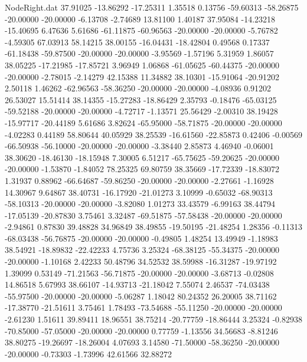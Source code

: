 \begin{filecontents}{NodeRight.dat}
  37.91025  -13.86292  -17.25311     1.35518    0.13756  -59.60313  -58.26875  -20.00000  -20.00000   -6.13708   -2.74689   13.81100    1.40187
  37.95084  -14.23218  -15.40695     6.47636    5.61686  -61.11875  -60.96563  -20.00000  -20.00000   -5.76782   -4.59305   67.03913   58.14215
  38.00155  -16.04431  -18.42804     0.49568    0.17337  -61.18438  -59.87500  -20.00000  -20.00000   -3.95569   -1.57196    5.31959    1.86057
  38.05225  -17.21985  -17.85721     3.96949    1.06868  -61.05625  -60.44375  -20.00000  -20.00000   -2.78015   -2.14279   42.15388   11.34882
  38.10301  -15.91064  -20.91202     2.50118    1.46262  -62.96563  -58.36250  -20.00000  -20.00000   -4.08936    0.91202   26.53027   15.51414
  38.14355  -15.27283  -18.86429     2.35793   -0.18476  -65.03125  -59.52188  -20.00000  -20.00000   -4.72717   -1.13571   25.56429   -2.00310
  38.19428  -15.97717  -20.44189     5.61686    3.82624  -65.95000  -58.71875  -20.00000  -20.00000   -4.02283    0.44189   58.80644   40.05929
  38.25539  -16.61560  -22.85873     0.42406   -0.00569  -66.50938  -56.10000  -20.00000  -20.00000   -3.38440    2.85873    4.46940   -0.06001
  38.30620  -18.46130  -18.15948     7.30005    6.51217  -65.75625  -59.20625  -20.00000  -20.00000   -1.53870   -1.84052   78.25325   69.80759
  38.35669  -17.72339  -18.83072     1.31937    0.88962  -66.64687  -59.86250  -20.00000  -20.00000   -2.27661   -1.16928   14.30967    9.64867
  38.40731  -16.17920  -21.01273     3.10999   -0.65032  -68.90313  -58.10313  -20.00000  -20.00000   -3.82080    1.01273   33.43579   -6.99163
  38.44794  -17.05139  -20.87830     3.75461    3.32487  -69.51875  -57.58438  -20.00000  -20.00000   -2.94861    0.87830   39.48828   34.96849
  38.49855  -19.50195  -21.48254     1.28356   -0.11313  -68.03438  -56.76875  -20.00000  -20.00000   -0.49805    1.48254   13.49949   -1.18983
  38.54921  -18.89832  -22.42233     4.75736    3.25324  -68.38125  -55.34375  -20.00000  -20.00000   -1.10168    2.42233   50.48796   34.52532
  38.59988  -16.31287  -19.97192     1.39099    0.53149  -71.21563  -56.71875  -20.00000  -20.00000   -3.68713   -0.02808   14.86518    5.67993
  38.66107  -14.93713  -21.18042     7.55074    2.46537  -74.03438  -55.97500  -20.00000  -20.00000   -5.06287    1.18042   80.24352   26.20005
  38.71162  -17.38770  -21.51611     3.75461    1.78493  -73.54688  -55.11250  -20.00000  -20.00000   -2.61230    1.51611   39.89411   18.96551
  38.75214  -20.77759  -18.86444     3.25324   -0.82938  -70.85000  -57.05000  -20.00000  -20.00000    0.77759   -1.13556   34.56683   -8.81246
  38.80275  -19.26697  -18.26004     4.07693    3.14580  -71.50000  -58.36250  -20.00000  -20.00000   -0.73303   -1.73996   42.61566   32.88272

\end{filecontents}
